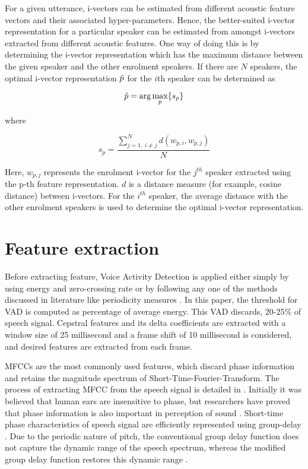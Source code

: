 \documentclass{article}
\begin{document}
For a given utterance, i-vectors can be estimated from different acoustic
feature vectors and their associated hyper-parameters. Hence, the
better-suited i-vector representation for a particular speaker can be estimated
from amongst i-vectors extracted from different acoustic features. One way of
doing this is by determining the i-vector representation which has the maximum
distance between the given speaker and the other enrolment speakers. If there
are $N$ speakers, the optimal i-vector representation $\Hat{p}$ 
for the $i$th speaker can be determined as

\begin{equation}
\Hat{p} = \arg\max_p \{s_p\}
\label{eq:p_hat}
\end{equation}

where 

\begin{equation}
s_p = \frac{\displaystyle \sum_{j=1, \; i \neq j}^N d(w_{p,i},w_{p,j})}{N}
\label{eq:sp}
\end{equation}

Here, $w_{p,j}$ represents the enrolment i-vector for the $j^{th}$ speaker
extracted using the p-th feature representation. $d$ is a distance measure (for
example, cosine distance) between i-vectors. For the $i^{th}$ speaker, the average
distance with the other enrolment speakers is used to determine the optimal
i-vector representation. 

\section{Feature extraction}
\label{sec:featExt}
Before extracting feature, Voice Activity Detection is applied either simply by using energy \cite{vadenergy, vadhari} and zero-crossing \cite{vadzc} rate or by following any one of the methods discussed in literature like periodicity measures \cite{vadtucker}. In this paper, the threshold for VAD is computed as percentage of average energy. This VAD discards, 20-25\% of speech signal. Cepstral features and its delta coefficients are extracted with a window size of 25 millisecond and a frame shift of 10 millisecond is considered, and desired features are extracted from each frame. 

\vspace{0.25cm}
MFCCs are the most commonly used features, which discard phase information and retains the magnitude spectrum of Short-Time-Fourier-Transform. The process of extracting MFCC from the speech signal is detailed in \cite{mel}. Initially it was believed that human ears are insensitive to phase, but researchers have  proved that phase information is also important in perception of sound \cite{shi}.  Short-time phase characteristics of speech signal are efficiently represented using group-delay \cite{group_delay}. Due to the periodic nature of pitch, the conventional group delay function does not capture the dynamic range of the speech spectrum, whereas the modified group delay function restores this dynamic range \cite{hema_gds}.
\end{document}
